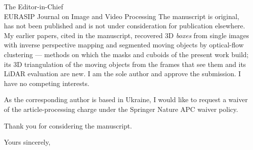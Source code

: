 \documentclass[11pt,a4paper]{letter}
\begin{document}
\begin{letter}{The Editor-in-Chief\\EURASIP Journal on Image and Video Processing}
The manuscript is original, has not been published and is not under consideration for publication elsewhere. My
earlier papers, cited in the manuscript, recovered 3D \emph{boxes} from single images with inverse perspective mapping
and segmented moving objects by optical-flow clustering --- methods on which the masks and cuboids of the present
work build; its 3D triangulation of the moving objects from the frames that see them and its LiDAR evaluation are
new. I am the sole author and approve the submission. I have no competing interests.

As the corresponding author is based in Ukraine, I would like to request a waiver of the article-processing charge
under the Springer Nature APC waiver policy.

Thank you for considering the manuscript.

\closing{Yours sincerely,}
\end{letter}
\end{document}
